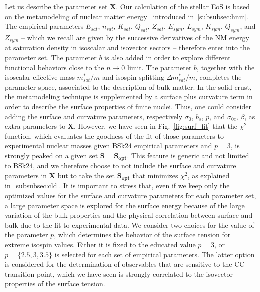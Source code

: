 Let us describe the parameter set $\bm{X}$. Our calculation
of the stellar EoS is based on the metamodeling of nuclear matter
energy~\cite{Margueron2018a} introduced in~\ref{subsubsec:hnm}. The empirical
parameters $E_{sat}$, $n_{sat}$, $K_{sat}$, $Q_{sat}$, $Z_{sat}$, $E_{sym}$,
$L_{sym}$, $K_{sym}$, $Q_{sym}$, and $Z_{sym}$ -- which we recall are given by 
the successive derivatives of the NM energy at saturation density in isoscalar 
and isovector sectors -- therefore 
enter into the parameter set. The parameter $b$ is also added in order 
to explore different functional behaviors close to the $n\rightarrow 0$ limit. 
The parameter $b$, together with the isoscalar effective mass $m_{sat}^*/m$ and 
isospin splitting $\Delta m_{sat}^*/m$, completes the parameter space, 
associated to the description of bulk matter.
In the solid crust, the metamodeling technique is supplemented by a surface 
plus curvature term in order to describe the surface properties of finite 
nuclei. Thus, one could consider adding the surface and curvature parameters, 
respectively $\sigma_0$, $b_s$, $p$, and $\sigma_{0c}$, $\beta$, as extra
parameters to $\bm{X}$. However, we have
seen in Fig.~\ref{fig:surf_fit} that the $\chi^2$ function, which evaluates the 
goodness of the fit of those parameters to experimental nuclear masses given 
BSk24 empirical parameters and $p=3$, is strongly peaked on a given set
$\bm{S}=\bm{S_{opt}}$. This feature is generic and not limited to BSk24, and we 
therefore choose to not include 
the surface and curvature parameters in $\bm{X}$ but to take the set 
$\bm{S_{opt}}$ that minimizes $\chi^2$, as explained in~\ref{subsubsec:cld}.
It is important to stress that, even if we keep only the optimized values for
the surface and curvature parameters for each parameter set, a large parameter
space is explored for the surface energy because of the large variation of the 
bulk properties and the physical correlation between surface and bulk due to 
the fit to experimental data.
We consider two choices for the value of the parameter $p$, which determines 
the behavior of the surface tension for extreme isospin values. Either it is 
fixed to the educated value $p=3$, or $p=\{2.5,3,3.5\}$ is selected for each
set of empirical parameters. The latter option is considered for the
determination of observables that are sensitive to the CC transition point, 
which we have seen is strongly correlated to the isovector properties of the 
surface tension.

